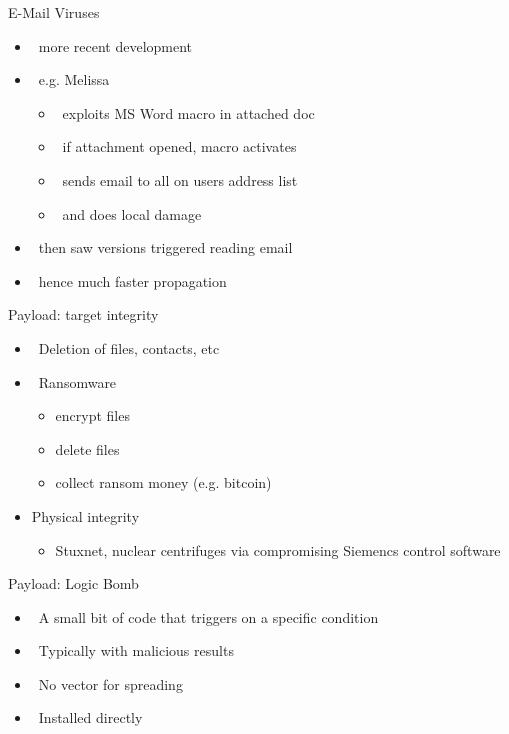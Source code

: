 \documentclass{beamer}
\begin{document}
\begin{frame}{E-Mail Viruses }
  \begin{itemize}
  \item  more recent development 
  \item  e.g. Melissa 
    \begin{itemize}
    \item  exploits MS Word macro in attached doc 
    \item  if attachment opened, macro activates 
    \item  sends email to all on users address list 
    \item  and does local damage 
    \end{itemize}
  \item  then saw versions triggered reading email 
  \item  hence much faster propagation
  \end{itemize}
\end{frame}




\begin{frame}{Payload: target integrity}
  \begin{itemize}
  \item  Deletion of files, contacts, etc
  \item  Ransomware
    \begin{itemize}
      \item encrypt files
      \item delete files
      \item collect ransom money (e.g. bitcoin)
    \end{itemize}
  \item Physical integrity
    \begin{itemize}
      \item Stuxnet, nuclear centrifuges via compromising  Siemencs
        control software
    \end{itemize}
  \end{itemize}
\end{frame}

\begin{frame}{Payload: Logic Bomb }
  \begin{itemize}
  \item  A small bit of code that triggers on a specific 
    condition 
  \item  Typically with malicious results 
  \item  No vector for spreading 
  \item  Installed directly
  \end{itemize}
\end{frame}
\end{document}

